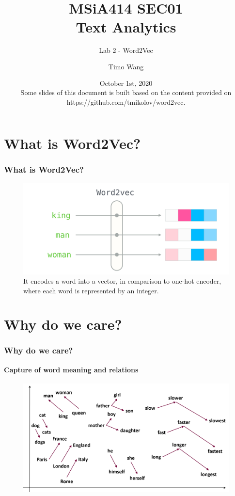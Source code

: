 \documentclass{beamer}
\begin{document}
\title{MSiA414 SEC01\\ Text Analytics}
\subtitle{Lab 2 - Word2Vec}
\author{Timo Wang}
\date{October 1st, 2020 \\
{\footnotesize Some slides of this document is built based on the content provided on https://github.com/tmikolov/word2vec.}}

\begin{frame}
    \titlepage
\end{frame}


\section{What is Word2Vec?}
\begin{frame}
    \frametitle{What is Word2Vec?}
    \begin{figure}
        \includegraphics[scale=0.5]{what-is-word2vec}
        \caption{It encodes a word into a vector, in comparison to one-hot encoder, where each word is represented by an integer.}
    \end{figure}
\end{frame}


\section{Why do we care?}
\begin{frame}
    \frametitle{Why do we care?}
    \framesubtitle{Capture of word meaning and relations}
    \begin{figure}
        \includegraphics[scale=0.5]{why-word2vec-1}
    \end{figure}
\end{frame}
\end{document}

